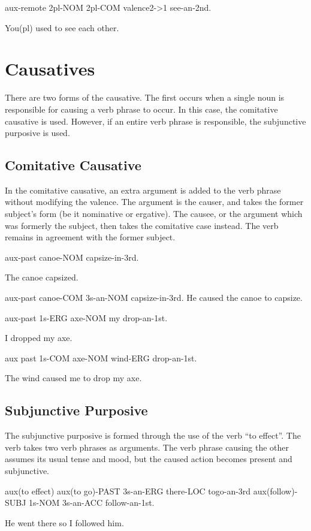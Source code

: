 aux-remote 2pl-NOM 2pl-COM valence2->1 see-an-2nd.

You(pl) used to see each other.

\section{Causatives}

There are two forms of the causative. The first occurs when a single noun is
responsible for causing a verb phrase to occur. In this case, the comitative
causative is used. However, if an entire verb phrase is responsible, the
subjunctive purposive is used.

\subsection{Comitative Causative}

In the comitative causative, an extra argument is added to the verb phrase
without modifying the valence. The argument is the causer, and takes the former
subject's form (be it nominative or ergative). The causee, or the argument which
was formerly the subject, then takes the comitative case instead. The verb
remains in agreement with the former subject.

aux-past canoe-NOM capsize-in-3rd.

The canoe capsized.

aux-past canoe-COM 3s-an-NOM capsize-in-3rd.
He caused the canoe to capsize.

aux-past 1s-ERG axe-NOM my drop-an-1st.

I dropped my axe.

aux past 1s-COM axe-NOM wind-ERG drop-an-1st.

The wind caused me to drop my axe.

\subsection{Subjunctive Purposive}

The subjunctive purposive is formed through the use of the verb ``to effect''.
The verb takes two verb phrases as arguments. The verb phrase causing the other
assumes its usual tense and mood, but the caused action becomes present and
subjunctive.

aux(to effect) aux(to go)-PAST 3s-an-ERG there-LOC togo-an-3rd aux(follow)-SUBJ
1s-NOM 3s-an-ACC follow-an-1st.

He went there so I followed him.

